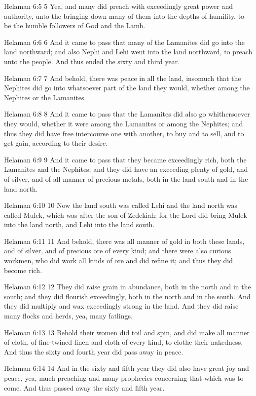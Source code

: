 Helaman 6:5
 5 Yea, and many did preach with exceedingly great power and
authority, unto the bringing down many of them into the depths of
humility, to be the humble followers of God and the Lamb.

Helaman 6:6
 6 And it came to pass that many of the Lamanites did go into the
land northward; and also Nephi and Lehi went into the land
northward, to preach unto the people. And thus ended the sixty
and third year.

Helaman 6:7
 7 And behold, there was peace in all the land, insomuch that the
Nephites did go into whatsoever part of the land they would,
whether among the Nephites or the Lamanites.

Helaman 6:8
 8 And it came to pass that the Lamanites did also go
whithersoever they would, whether it were among the Lamanites or
among the Nephites; and thus they did have free intercourse one
with another, to buy and to sell, and to get gain, according to
their desire.

Helaman 6:9
 9 And it came to pass that they became exceedingly rich, both
the Lamanites and the Nephites; and they did have an exceeding
plenty of gold, and of silver, and of all manner of precious
metals, both in the land south and in the land north.

Helaman 6:10
 10 Now the land south was called Lehi and the land north was
called Mulek, which was after the son of Zedekiah; for the Lord
did bring Mulek into the land north, and Lehi into the land
south.

Helaman 6:11
 11 And behold, there was all manner of gold in both these lands,
and of silver, and of precious ore of every kind; and there were
also curious workmen, who did work all kinds of ore and did
refine it; and thus they did become rich.

Helaman 6:12
 12 They did raise grain in abundance, both in the north and in
the south; and they did flourish exceedingly, both in the north
and in the south. And they did multiply and wax exceedingly
strong in the land. And they did raise many flocks and herds,
yea, many fatlings.

Helaman 6:13
 13 Behold their women did toil and spin, and did make all manner
of cloth, of fine-twined linen and cloth of every kind, to clothe
their nakedness. And thus the sixty and fourth year did pass
away in peace.

Helaman 6:14
 14 And in the sixty and fifth year they did also have great joy
and peace, yea, much preaching and many prophecies concerning
that which was to come. And thus passed away the sixty and fifth
year.

